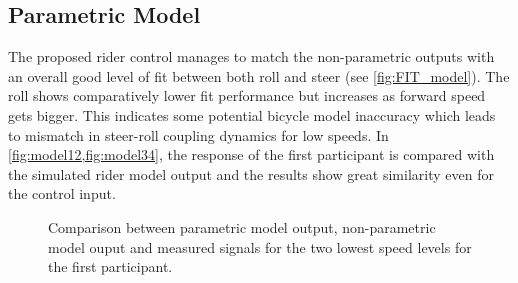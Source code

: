 \subsection{Parametric Model}
The proposed rider control manages to match the non-parametric outputs with an overall good level of fit between both roll and steer (see \cref{fig:FIT_model}). The roll  shows comparatively lower fit performance but increases as forward speed gets bigger. This indicates some potential bicycle model inaccuracy which  leads to mismatch in steer-roll coupling dynamics for low speeds. In \cref{fig:model12,fig:model34}, the response of the first participant is compared with the simulated rider model output and the results show great similarity even for the control input.
\begin{figure}
    \centering
    \begin{subfigure}[b]{\textwidth}
        \centering
        \caption{}
        \label{fig:model1}
    \end{subfigure}
    \begin{subfigure}[b]{\textwidth}
        \centering
        \caption{}            
        \label{fig:model2}
    \end{subfigure}
    \caption{Comparison between parametric model output, non-parametric model ouput and measured signals for the two lowest speed levels for the first participant.}
    \label{fig:model12}
 \end{figure}

